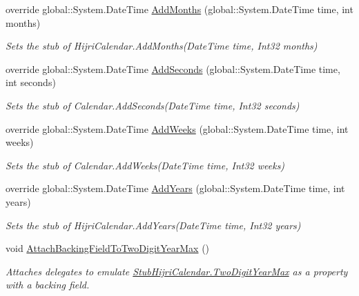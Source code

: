 \begin{DoxyCompactItemize}
override global\-::\-System.\-Date\-Time \hyperlink{class_system_1_1_globalization_1_1_fakes_1_1_stub_hijri_calendar_ace7330abb66dd4d20149587e87b22da5}{Add\-Months} (global\-::\-System.\-Date\-Time time, int months)
\begin{DoxyCompactList}\small\item\em Sets the stub of Hijri\-Calendar.\-Add\-Months(\-Date\-Time time, Int32 months)\end{DoxyCompactList}\item 
override global\-::\-System.\-Date\-Time \hyperlink{class_system_1_1_globalization_1_1_fakes_1_1_stub_hijri_calendar_a6c0d5fed1245e8392c5c477faeb10b3e}{Add\-Seconds} (global\-::\-System.\-Date\-Time time, int seconds)
\begin{DoxyCompactList}\small\item\em Sets the stub of Calendar.\-Add\-Seconds(\-Date\-Time time, Int32 seconds)\end{DoxyCompactList}\item 
override global\-::\-System.\-Date\-Time \hyperlink{class_system_1_1_globalization_1_1_fakes_1_1_stub_hijri_calendar_a8b406fd057bffbd42d1d0b81f4353ea3}{Add\-Weeks} (global\-::\-System.\-Date\-Time time, int weeks)
\begin{DoxyCompactList}\small\item\em Sets the stub of Calendar.\-Add\-Weeks(\-Date\-Time time, Int32 weeks)\end{DoxyCompactList}\item 
override global\-::\-System.\-Date\-Time \hyperlink{class_system_1_1_globalization_1_1_fakes_1_1_stub_hijri_calendar_ac77fda7dea62107f606e3d076427fdf0}{Add\-Years} (global\-::\-System.\-Date\-Time time, int years)
\begin{DoxyCompactList}\small\item\em Sets the stub of Hijri\-Calendar.\-Add\-Years(\-Date\-Time time, Int32 years)\end{DoxyCompactList}\item 
void \hyperlink{class_system_1_1_globalization_1_1_fakes_1_1_stub_hijri_calendar_a6416384fce096330a27576a7248b1178}{Attach\-Backing\-Field\-To\-Two\-Digit\-Year\-Max} ()
\begin{DoxyCompactList}\small\item\em Attaches delegates to emulate \hyperlink{class_system_1_1_globalization_1_1_fakes_1_1_stub_hijri_calendar_abc56824fe0276e40a858128186b6e780}{Stub\-Hijri\-Calendar.\-Two\-Digit\-Year\-Max} as a property with a backing field.\end{DoxyCompactList}\item 

\end{DoxyCompactItemize}
